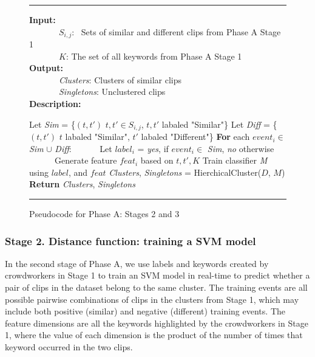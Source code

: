 \begin{figure}
\footnotesize
\hrule
\vspace{2 pt}
\textbf{Input:}\\
\indent \ \ \ \ \ \ \ $S_{i,j}$: \ Sets of similar and different clips from Phase A Stage 1\\
\indent \ \ \ \ \ \ \ $K$: The set of all keywords from Phase A Stage 1 \\
\textbf{Output:} \\
\indent \ \ \ \ \ \ \ \textit{Clusters}: Clusters of similar clips \\
\indent \ \ \ \ \ \ \ \textit{Singletons}: Unclustered clips \\
\textbf{Description:}
\begin{algorithmic}[1]
\STATE Let \textit{Sim} = \{$(t, t')$ $t, t' \in S_{i,j}$, $t, t'$ labaled "Similar"\}
\STATE Let \textit{Diff} = \{$(t, t')$ $t$ labaled "Similar", $t'$ labaled "Different"\}
\STATE \textbf{For} each $event_i \in$ \textit{Sim} $\cup$ \textit{Diff}:
    \STATE \ \ \ \ \ \ Let $label_i$ = \textit{yes}, if $event_i \in$ \textit{Sim}, \textit{no} otherwise \\
    \STATE \ \ \ \ \ \ Generate feature $feat_{i}$ based on $t, t', K$
\STATE Train classifier \textit{M} using $label$, and $feat$
\STATE \textit{Clusters}, \textit{Singletons} = HierchicalCluster($D$, $M$)
\STATE \textbf{Return} \textit{Clusters}, \textit{Singletons}
\end{algorithmic}
\hrule
\label{fig:phaseAstage2stage3}
\caption{Pseudocode for Phase A: Stages 2 and 3}
\end{figure}

\subsubsection{Stage 2. Distance function: training a SVM model}

In the second stage of Phase A, we use labels and keywords created by
crowdworkers in Stage 1 to train an SVM model in real-time to predict whether a
pair of clips in the dataset belong to the same cluster. The training events
are all possible pairwise combinations of clips in the clusters from Stage 1,
which may include both positive (similar) and negative (different) training
events.  The feature dimensions are all the keywords highlighted by the
crowdworkers in Stage 1, where the value of each dimension is the product of
the number of times that keyword occurred in the two clips.


